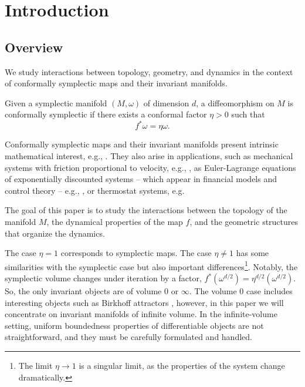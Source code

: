 \documentclass[11pt]{amsart}
\theoremstyle{definition}
\theoremstyle{remark}
\numberwithin{equation}{section}
\begin{document}
\tableofcontents

\section{Introduction}\label{sec:introduction}

\subsection{Overview}

We study  interactions between topology, geometry, and dynamics in the context of conformally symplectic maps and their invariant manifolds.

\medskip

Given a symplectic
manifold $(M, \omega)$ of dimension  $d$, a diffeomorphism on $M$ is conformally
symplectic if there exists a conformal factor $\eta >0 $ such that
\begin{equation*}
\label{first-cs}
f^* \omega = \eta \omega .
\end{equation*}


Conformally symplectic maps and their invariant manifolds
present intrinsic mathematical  interest, e.g.,
\cite{AllaisA24,Banyaga02,Lee46,Vaisman75,Vaisman85}.
They also arise in  applications, such as mechanical systems
with friction proportional to velocity, e.g., \cite{CallejaCL22, MargheriOR14, BiascoCh09}, as Euler-Lagrange
equations of exponentially discounted
systems  -- which appear in financial models and control
theory -- e.g., \cite{Bensoussan88}, or  thermostat  systems, e.g.  \cite{wojtkowski1998conformally}

\medskip

The goal of this paper is to study the interactions between the topology of the manifold $M$, the dynamical properties of the map $f$, and the geometric structures that organize the dynamics.

The case $\eta = 1$  corresponds to symplectic maps.
The case $\eta \ne 1$ has some similarities with the symplectic case
but also important differences\footnote{
The limit $\eta \to 1$  is a singular limit, as the properties of the  system change dramatically.}.
Notably, the symplectic volume changes under iteration by a factor, $f^* \left(\omega^{ d/2}\right ) = \eta^{d/2} \left( \omega^{ d/2}\right)$.
So, the only invariant objects are of volume $0$ or $\infty$.
The volume $0$ case includes interesting objects such as
Birkhoff attractors \cite{arnaud2024higherdimensionalbirkhoffattractors},
however,  in this paper  we will concentrate on  invariant manifolds of infinite volume.
In the infinite-volume setting,   uniform boundedness properties of differentiable objects are not straightforward, and  they must be  carefully formulated and handled.
\end{document}
